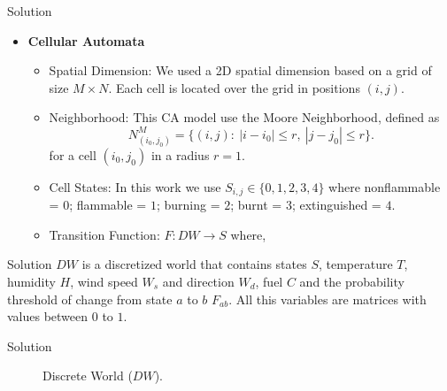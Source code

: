 \documentclass{beamer}
\begin{document}
      \begin{frame}{Solution}
        \begin{itemize}
          \item<1-> \textbf{Cellular Automata}
            \begin{itemize}
              \item<2-> Spatial Dimension: We used a 2D spatial dimension based on a grid of size $M\times N$.
                Each cell is located over the grid in positions $(i,j)$.
              \item<3-> Neighborhood: This CA model use the Moore Neighborhood, defined as
                \begin{equation}
                  N_{(i_0,j_0)}^M = \{(i,j): ~ |i-i_0|\leq r, ~ |j-j_0|\leq r \}.
                \end{equation}
                for a cell $(i_0, j_0)$ in a radius $r=1$.
              \item<4-> Cell States: In this work we use $S_{i,j}\in \{0, 1, 2, 3, 4\}$ where nonflammable = $0$; 
                flammable = $1$; burning = $2$; burnt = $3$; extinguished = $4$.
              \item<5-> Transition Function: $F: DW \rightarrow S$ where,
            \end{itemize}
        \end{itemize}
      \end{frame}
      
      \begin{frame}{Solution}
        $DW$ is a discretized world that contains states $S$, temperature $T$, humidity $H$, wind speed $W_s$ 
        and direction $W_d$, fuel $C$ and the probability threshold of change from state $a$ to $b$ $F_{ab}$. 
        All this variables are matrices with values between $0$ to $1$. 
      \end{frame}

      \begin{frame}{Solution}
        \begin{figure}
          \centering
          \resizebox{0.5\textwidth}{!}{
            
          }    
          \caption{Discrete World ($DW$).}
          \label{fig:discrete_world}
        \end{figure}
      \end{frame}
\end{document}
